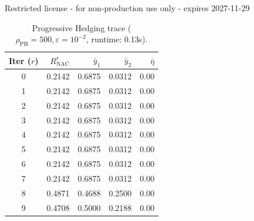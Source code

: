 Restricted license - for non-production use only - expires 2027-11-29
\begin{table}[ht]
\centering
\caption{Progressive Hedging trace ($\rho_{\mathrm{PH}}=500, \varepsilon=10^{-2}$, runtime: 0.13s).}
\begin{tabular}{crrrr}
\toprule
Iter ($r$) & $R_{\mathrm{NAC}}^r$ & $\bar{y}_1$ & $\bar{y}_2$ & $\bar{\eta}$ \\
\midrule
0 & 0.2142 & 0.6875 & 0.0312 & 0.00 \\
1 & 0.2142 & 0.6875 & 0.0312 & 0.00 \\
2 & 0.2142 & 0.6875 & 0.0312 & 0.00 \\
3 & 0.2142 & 0.6875 & 0.0312 & 0.00 \\
4 & 0.2142 & 0.6875 & 0.0312 & 0.00 \\
5 & 0.2142 & 0.6875 & 0.0312 & 0.00 \\
6 & 0.2142 & 0.6875 & 0.0312 & 0.00 \\
7 & 0.2142 & 0.6875 & 0.0312 & 0.00 \\
8 & 0.4871 & 0.4688 & 0.2500 & 0.00 \\
9 & 0.4708 & 0.5000 & 0.2188 & 0.00 \\
\bottomrule
\end{tabular}
\label{tab:ph_raw}
\end{table}
